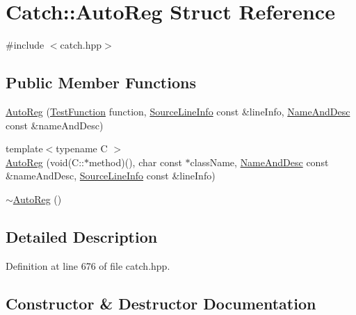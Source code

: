 \hypertarget{struct_catch_1_1_auto_reg}{}\section{Catch\+:\+:Auto\+Reg Struct Reference}
\label{struct_catch_1_1_auto_reg}


{\ttfamily \#include $<$catch.\+hpp$>$}

\subsection*{Public Member Functions}
\begin{DoxyCompactItemize}
\item 
\hyperlink{struct_catch_1_1_auto_reg_af224f4568d57b8652474df475a164a8c}{Auto\+Reg} (\hyperlink{namespace_catch_a26414f52d0835939fae52aadd27e6257}{Test\+Function} function, \hyperlink{struct_catch_1_1_source_line_info}{Source\+Line\+Info} const \&line\+Info, \hyperlink{struct_catch_1_1_name_and_desc}{Name\+And\+Desc} const \&name\+And\+Desc)
\item 
{\footnotesize template$<$typename C $>$ }\\\hyperlink{struct_catch_1_1_auto_reg_a1bf9207fe0a02b46dc0ab1cc03cbe738}{Auto\+Reg} (void(C\+::$\ast$method)(), char const $\ast$class\+Name, \hyperlink{struct_catch_1_1_name_and_desc}{Name\+And\+Desc} const \&name\+And\+Desc, \hyperlink{struct_catch_1_1_source_line_info}{Source\+Line\+Info} const \&line\+Info)
\item 
\hyperlink{struct_catch_1_1_auto_reg_a3cdb53f1e5ff115310f3372bebe198f1}{$\sim$\+Auto\+Reg} ()
\end{DoxyCompactItemize}


\subsection{Detailed Description}


Definition at line 676 of file catch.\+hpp.



\subsection{Constructor \& Destructor Documentation}
\hypertarget{struct_catch_1_1_auto_reg_af224f4568d57b8652474df475a164a8c}{}\label{struct_catch_1_1_auto_reg_af224f4568d57b8652474df475a164a8c} 
